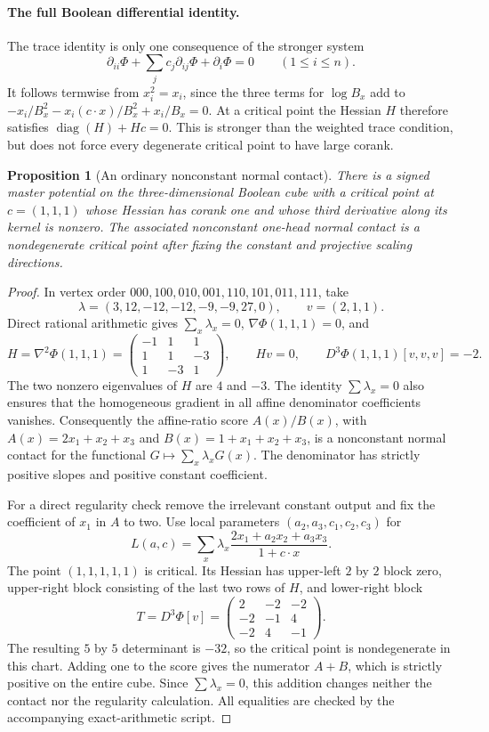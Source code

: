 \documentclass[11pt]{article}
\newtheorem{proposition}{Proposition}
\begin{document}
\paragraph{The full Boolean differential identity.}
The trace identity is only one consequence of the stronger system
\[
 \partial_{ii}\Phi+\sum_jc_j\partial_{ij}\Phi+\partial_i\Phi=0
 \qquad(1\leq i\leq n).
\]
It follows termwise from $x_i^2=x_i$, since the three terms for
$\log B_x$ add to $-x_i/B_x^2-x_i(c\cdot x)/B_x^2+x_i/B_x=0$.
At a critical point the Hessian $H$ therefore satisfies
$\operatorname{diag}(H)+Hc=0$. This is stronger than the weighted trace
condition, but does not force every degenerate critical point to have
large corank.

\begin{proposition}[An ordinary nonconstant normal contact]
There is a signed master potential on the three-dimensional Boolean cube
with a critical point at $c=(1,1,1)$ whose Hessian has corank one and whose
third derivative along its kernel is nonzero. The associated nonconstant
one-head normal contact is a nondegenerate critical point after fixing
the constant and projective scaling directions.
\end{proposition}
\begin{proof}
In vertex order $000,100,010,001,110,101,011,111$, take
\[
 \lambda=(3,12,-12,-12,-9,-9,27,0),\qquad v=(2,1,1).
\]
Direct rational arithmetic gives $\sum_x\lambda_x=0$,
$\nabla\Phi(1,1,1)=0$, and
\[
 H=\nabla^2\Phi(1,1,1)=
 \begin{pmatrix}-1&1&1\\1&1&-3\\1&-3&1\end{pmatrix},
 \qquad Hv=0,\qquad
 D^3\Phi(1,1,1)[v,v,v]=-2.
\]
The two nonzero eigenvalues of $H$ are $4$ and $-3$.
The identity $\sum\lambda_x=0$ also ensures that the homogeneous
gradient in all affine denominator coefficients vanishes.
Consequently the affine-ratio score
$A(x)/B(x)$, with $A(x)=2x_1+x_2+x_3$ and
$B(x)=1+x_1+x_2+x_3$, is a nonconstant normal contact for the
functional $G\mapsto\sum_x\lambda_xG(x)$. The denominator has
strictly positive slopes and positive constant coefficient.

For a direct regularity check remove the irrelevant constant output and
fix the coefficient of $x_1$ in $A$ to two. Use local parameters
$(a_2,a_3,c_1,c_2,c_3)$ for
\[
 L(a,c)=\sum_x\lambda_x
       \frac{2x_1+a_2x_2+a_3x_3}{1+c\cdot x}.
\]
The point $(1,1,1,1,1)$ is critical. Its Hessian has upper-left
$2$ by $2$ block zero, upper-right block consisting of the last two
rows of $H$, and lower-right block
\[
 T=D^3\Phi[v]=
 \begin{pmatrix}2&-2&-2\\-2&-1&4\\-2&4&-1\end{pmatrix}.
\]
The resulting $5$ by $5$ determinant is $-32$, so the critical point is
nondegenerate in this chart. Adding one to the score gives the numerator
$A+B$, which is strictly positive on the entire cube. Since
$\sum\lambda_x=0$, this addition changes neither the contact nor the
regularity calculation. All equalities are checked by the accompanying
exact-arithmetic script.
\end{proof}
\end{document}
